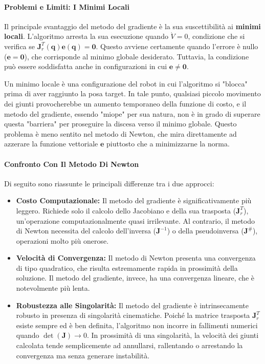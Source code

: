 \documentclass[11pt, a4paper]{report}
\begin{document}
\paragraph{Problemi e Limiti: I Minimi Locali}
Il principale svantaggio del metodo del gradiente è la sua suscettibilità ai \textbf{minimi locali}. L'algoritmo arresta la sua esecuzione quando \(\dot{V} = 0\), condizione che si verifica se \(\bm{J}_r^T(\bm{q}) \bm{e}(\bm{q}) = \bm{0}\). Questo avviene certamente quando l'errore è nullo (\(\bm{e}=\bm{0}\)), che corrisponde al minimo globale desiderato. Tuttavia, la condizione può essere soddisfatta anche in configurazioni in cui \(\bm{e} \neq \bm{0}\).

Un minimo locale è una configurazione del robot in cui l'algoritmo si "blocca" prima di aver raggiunto la posa target. In tale punto, qualsiasi piccolo movimento dei giunti provocherebbe un aumento temporaneo della funzione di costo, e il metodo del gradiente, essendo "miope" per sua natura, non è in grado di superare questa "barriera" per proseguire la discesa verso il minimo globale. Questo problema è meno sentito nel metodo di Newton, che mira direttamente ad azzerare la funzione vettoriale \(\bm{e}\) piuttosto che a minimizzarne la norma.

\paragraph{Confronto Con Il Metodo Di Newton}
Di seguito sono riassunte le principali differenze tra i due approcci:
\begin{itemize}
    \item \textbf{Costo Computazionale:} Il metodo del gradiente è significativamente più leggero. Richiede solo il calcolo dello Jacobiano e della sua trasposta (\(\bm{J}_r^T\)), un'operazione computazionalmente quasi irrilevante. Al contrario, il metodo di Newton necessita del calcolo dell'inversa (\(\bm{J}^{-1}\)) o della pseudoinversa (\(\bm{J}^{\#}\)), operazioni molto più onerose.
    \item \textbf{Velocità di Convergenza:} Il metodo di Newton presenta una convergenza di tipo quadratico, che risulta estremamente rapida in prossimità della soluzione. Il metodo del gradiente, invece, ha una convergenza lineare, che è notevolmente più lenta.
    \item \textbf{Robustezza alle Singolarità:} Il metodo del gradiente è intrinsecamente robusto in presenza di singolarità cinematiche. Poiché la matrice trasposta \(\bm{J}_r^T\) esiste sempre ed è ben definita, l'algoritmo non incorre in fallimenti numerici quando \(\det(\bm{J}) \to 0\). In prossimità di una singolarità, la velocità dei giunti calcolata tende semplicemente ad annullarsi, rallentando o arrestando la convergenza ma senza generare instabilità.
\end{itemize}
\end{document}
